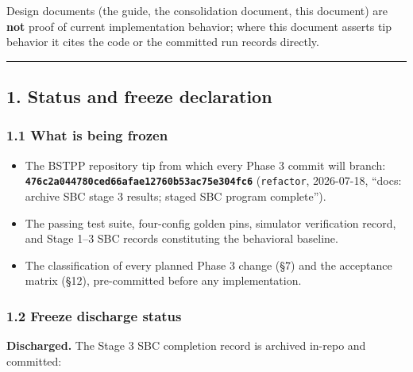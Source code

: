 \documentclass[
  10pt,
]{article}
\providecommand{\tightlist}{%
  \setlength{\itemsep}{0pt}\setlength{\parskip}{0pt}}
\begin{document}
Design documents (the guide, the consolidation document, this document) are \textbf{not} proof of current implementation behavior; where this document asserts tip behavior it cites the code or the committed run records directly.

\begin{center}\rule{0.5\linewidth}{0.5pt}\end{center}

\hypertarget{status-and-freeze-declaration}{%
\subsection{1. Status and freeze declaration}\label{status-and-freeze-declaration}}

\hypertarget{what-is-being-frozen}{%
\subsubsection{1.1 What is being frozen}\label{what-is-being-frozen}}

\begin{itemize}
\tightlist
\item
  The BSTPP repository tip from which every Phase 3 commit will branch: \textbf{\texttt{476c2a0447\allowbreak{}80ced66afa\allowbreak{}e12760b53a\allowbreak{}c75e304fc6}} (\texttt{refactor}, 2026-07-18, ``docs: archive SBC stage 3 results; staged SBC program complete'').
\item
  The passing test suite, four-config golden pins, simulator verification record, and Stage 1--3 SBC records constituting the behavioral baseline.
\item
  The classification of every planned Phase 3 change (§7) and the acceptance matrix (§12), pre-committed before any implementation.
\end{itemize}

\hypertarget{freeze-discharge-status}{%
\subsubsection{1.2 Freeze discharge status}\label{freeze-discharge-status}}

\textbf{Discharged.} The Stage 3 SBC completion record is archived in-repo and committed:
\end{document}
